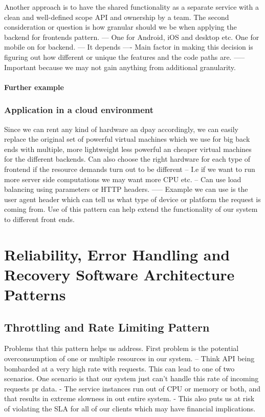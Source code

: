 \documentclass[a4paper, 11pt]{book}
\begin{document}
    Another approach is to have the shared functionality as a separate service with a clean and well-defined scope API and ownership by a team.
    The second consideration or question is how granular should we be when applying the backend for frontends pattern.
    --- One for Android, iOS and desktop etc. One for mobile on for backend.
    --- It depends
    ---- Main factor in making this decision is figuring out how different or unique the features and the code paths are.
    ----- Important because we may not gain anything from additional granularity.

    \paragraph{Further example}

    \subsubsection{Application in a cloud environment}
    Since we can rent any kind of hardware an dpay accordingly, we can easily replace the original set of powerful virtual machines which we use for big back ends with multiple, more lightweight less powerful an cheaper virtual machines for the different backends.
    Can also choose the right hardware for each type of frontend if the resource demands turn out to be different
    -- I.e if we want to run more server side computations we may want more CPU etc.
    -- Can use load balancing using parameters or HTTP headers.
    ----- Example we can use is the user agent header which can tell us what type of device or platform the request is coming from.
    Use of this pattern can help extend the functionality of our system to different front ends.


    \section{Reliability, Error Handling and Recovery Software Architecture Patterns}

    \subsection{Throttling and Rate Limiting Pattern}
    Problems that this pattern helps us address.
    First problem is the potential overconsumption of one or multiple resources in our system.
    -- Think API being bombarded at a very high rate with requests.
    This can lead to one of two scenarios.
    One scenario is that our system just can't handle this rate of incoming requests pr data.
    - The service instances run out of CPU or memory or both, and that results in extreme slowness in out entire system.
    - This also puts us at risk of violating the SLA for all of our clients which may have financial implications.
\end{document}
